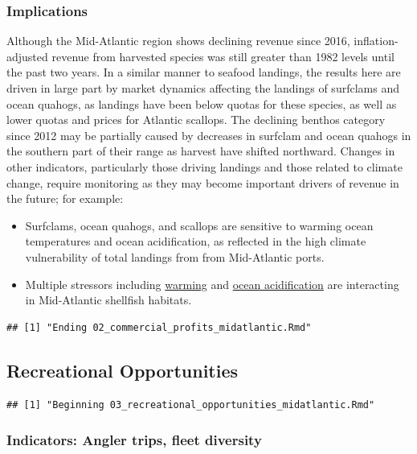 \documentclass[
  10pt,
]{article}
\providecommand{\tightlist}{%
  \setlength{\itemsep}{0pt}\setlength{\parskip}{0pt}}
\begin{document}
\subsubsection{Implications}\label{implications-1}

Although the Mid-Atlantic region shows declining revenue since 2016, inflation-adjusted revenue from harvested species was still greater than 1982 levels until the past two years. In a similar manner to seafood landings, the results here are driven in large part by market dynamics affecting the landings of surfclams and ocean quahogs, as landings have been below quotas for these species, as well as lower quotas and prices for Atlantic scallops. The declining benthos category since 2012 may be partially caused by decreases in surfclam and ocean quahogs in the southern part of their range as harvest have shifted northward. Changes in other indicators, particularly those driving landings and those related to climate change, require monitoring as they may become important drivers of revenue in the future; for example:

\begin{itemize}
\tightlist
\item
  Surfclams, ocean quahogs, and scallops are sensitive to warming ocean temperatures and ocean acidification, as reflected in the high climate vulnerability of total landings from from Mid-Atlantic ports.
\item
  Multiple stressors including \href{https://noaa-edab.github.io/catalog/bottom_temp_insitu.html}{warming} and \href{https://noaa-edab.github.io/catalog/ocean_acidification}{ocean acidification} are interacting in Mid-Atlantic shellfish habitats.
\end{itemize}

\begin{verbatim}
## [1] "Ending 02_commercial_profits_midatlantic.Rmd"
\end{verbatim}

\subsection{Recreational Opportunities}\label{recreational-opportunities}

\begin{verbatim}
## [1] "Beginning 03_recreational_opportunities_midatlantic.Rmd"
\end{verbatim}

\subsubsection{Indicators: Angler trips, fleet diversity}\label{indicators-angler-trips-fleet-diversity}
\end{document}
